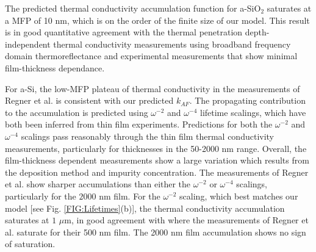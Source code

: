 \documentclass[aps,prb,onecolumn,preprint,superscriptaddress,footinbib,amsmath,amssymb,floatfix]{revtex4}
\begin{document}
The predicted thermal conductivity accumulation function for a-SiO$_2$ 
saturates at a MFP of 10 nm, which is on the order of the finite size 
of our model. This result is in good quantitative agreement 
with the thermal penetration depth-independent thermal 
conductivity measurements using broadband frequency domain 
thermoreflectance\cite{regner_broadband_2013} and experimental 
measurements that show minimal film-thickness dependance.
\cite{lee_heat_1997,yamane_measurement_2002} 

For a-Si, the low-MFP plateau of thermal conductivity in the   
measurements of Regner et al. is consistent with our 
predicted $k_{AF}$. 
The propagating contribution to the accumulation is predicted 
using $\omega^{-2}$ and $\omega^{-4}$ lifetime scalings, which 
have both been inferred from thin film experiments.
\cite{feldman_thermal_1993,cahill_thermal_1994,
feldman_numerical_1999,zink_thermal_2006,zink_excess_2006,
liu_high_2009,yang_anomalously_2010} 
Predictions for both the $\omega^{-2}$ and $\omega^{-4}$ scalings 
pass reasonably through the thin film thermal conductivity 
measurements, particularly for thicknesses in the 50-2000 nm range. 
Overall, the film-thickness dependent measurements show a large 
variation which results from the deposition method and impurity 
concentration.
\cite{vacher_attenuation_1980,liu_high_2009,yang_anomalously_2010,
li_effect_2011} 
The measurements of Regner et al. show sharper accumulations 
than either the $\omega^{-2}$ or $\omega^{-4}$ scalings, 
particularly for the $2000$ nm film. 
For the $\omega^{-2}$ scaling, which best matches our model 
[see Fig. \ref{FIG:Lifetimes}(b)], 
the thermal conductivity accumulation 
saturates at $1$ $\mu$m, in good agreement with where the measurements 
of Regner et al. saturate for their 500 nm film. The 2000 nm 
film accumulation shows no sign of saturation. 


\end{document}
